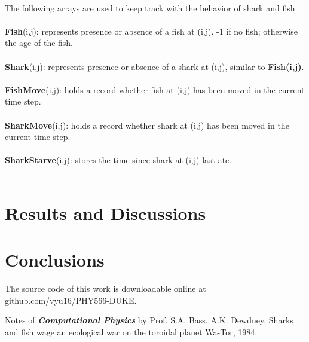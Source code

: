 \documentclass{article}
\begin{document}
\\
The following arrays are used to keep track with the behavior of shark and fish:\\
\\
\textbf{Fish}(i,j): represents presence or absence of a fish at (i,j). -1 if no fish; otherwise the age of the fish.\\
\\
\textbf{Shark}(i,j): represents presence or absence of a shark at (i,j), similar to \textbf{Fish(i,j)}.\\
\\
\textbf{FishMove}(i,j): holds a record whether fish at (i,j) has been moved in the current time step.\\
\\
\textbf{SharkMove}(i,j): holds a record whether shark at (i,j) has been moved in the current time step.\\
\\
\textbf{SharkStarve}(i,j): stores the time since shark at (i,j) last ate.\\
\\

\section{Results and Discussions}


\section{Conclusions}

The source code of this work is downloadable online at github.com/vyu16/PHY566-DUKE.

\begin{thebibliography}{9}
Notes of \textbf{\textit{Computational Physics}} by Prof. S.A. Bass.
A.K. Dewdney, Sharks and fish wage an ecological war on the toroidal planet Wa-Tor, 1984.
\end{thebibliography}
\end{document}
